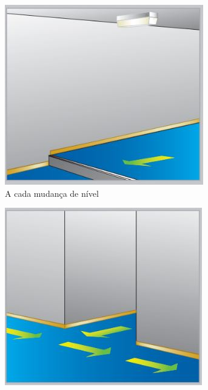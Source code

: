 	\begin{figure}[H]
		\centering
		\begin{subfigure}[b]{0.3\textwidth}
			\centering
			\includegraphics[width=\textwidth]{Figures/3. Lighting/light-safety7.jpg}
			\caption{A cada mudança de nível}
			\label{fig: style 1 image g}
		\end{subfigure}
		\hfill
		\begin{subfigure}[b]{0.3\textwidth}
			\centering
			\includegraphics[width=\textwidth]{Figures/3. Lighting/light-safety8.jpg}

\end{subfigure}
\end{figure}
